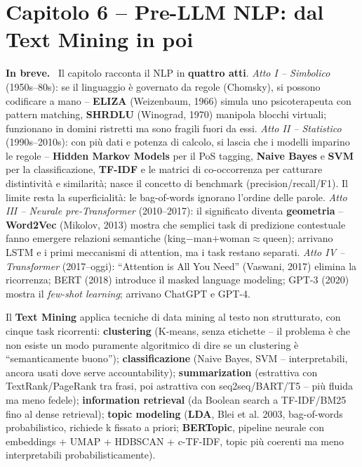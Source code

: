 \documentclass[11pt,a4paper]{article}
\newcommand{\spiega}{\medskip\noindent\textbf{\textcolor{blue!45!black}{In breve.}}\ }
\begin{document}
\section*{Capitolo 6 -- Pre-LLM NLP: dal Text Mining in poi}

\spiega
Il capitolo racconta il NLP in \textbf{quattro atti}. \emph{Atto I -- Simbolico} (1950s--80s): se il linguaggio \`e governato da regole (Chomsky), si possono codificare a mano -- \textbf{ELIZA} (Weizenbaum, 1966) simula uno psicoterapeuta con pattern matching, \textbf{SHRDLU} (Winograd, 1970) manipola blocchi virtuali; funzionano in domini ristretti ma sono fragili fuori da essi. \emph{Atto II -- Statistico} (1990s--2010s): con pi\`u dati e potenza di calcolo, si lascia che i modelli imparino le regole -- \textbf{Hidden Markov Models} per il PoS tagging, \textbf{Naive Bayes} e \textbf{SVM} per la classificazione, \textbf{TF-IDF} e le matrici di co-occorrenza per catturare distintivit\`a e similarit\`a; nasce il concetto di benchmark (precision/recall/F1). Il limite resta la superficialit\`a: le bag-of-words ignorano l'ordine delle parole. \emph{Atto III -- Neurale pre-Transformer} (2010--2017): il significato diventa \textbf{geometria} -- \textbf{Word2Vec} (Mikolov, 2013) mostra che semplici task di predizione contestuale fanno emergere relazioni semantiche (king$-$man$+$woman$\approx$queen); arrivano LSTM e i primi meccanismi di attention, ma i task restano separati. \emph{Atto IV -- Transformer} (2017--oggi): ``Attention is All You Need'' (Vaswani, 2017) elimina la ricorrenza; BERT (2018) introduce il masked language modeling; GPT-3 (2020) mostra il \emph{few-shot learning}; arrivano ChatGPT e GPT-4.

Il \textbf{Text Mining} applica tecniche di data mining al testo non strutturato, con cinque task ricorrenti: \textbf{clustering} (K-means, senza etichette -- il problema \`e che non esiste un modo puramente algoritmico di dire se un clustering \`e ``semanticamente buono''); \textbf{classificazione} (Naive Bayes, SVM -- interpretabili, ancora usati dove serve accountability); \textbf{summarization} (estrattiva con TextRank/PageRank tra frasi, poi astrattiva con seq2seq/BART/T5 -- pi\`u fluida ma meno fedele); \textbf{information retrieval} (da Boolean search a TF-IDF/BM25 fino al dense retrieval); \textbf{topic modeling} (\textbf{LDA}, Blei et al. 2003, bag-of-words probabilistico, richiede k fissato a priori; \textbf{BERTopic}, pipeline neurale con embeddings + UMAP + HDBSCAN + c-TF-IDF, topic pi\`u coerenti ma meno interpretabili probabilisticamente).
\end{document}
